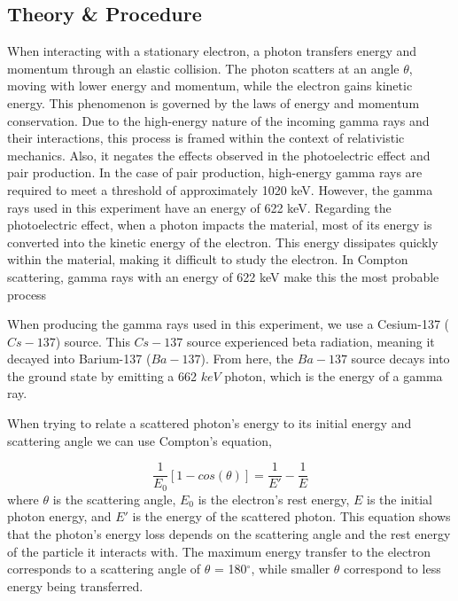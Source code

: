 \documentclass[a4paper,12pt,english]{all-in-one} %
\begin{document}
\begin{multicols}{2}

\section*{Theory \& Procedure}
{
When interacting with a stationary electron, a photon transfers energy and momentum through an elastic collision. The photon scatters at an angle $\theta$, moving with lower energy and momentum, while the electron gains kinetic energy. This phenomenon is governed by the laws of energy and momentum conservation. Due to the high-energy nature of the incoming gamma rays and their interactions, this process is framed within the context of relativistic mechanics. Also, it negates the effects observed in the photoelectric effect and pair production. In the case of pair production, high-energy gamma rays are required to meet a threshold of approximately 1020 keV. However, the gamma rays used in this experiment have an energy of 622 keV. Regarding the photoelectric effect, when a photon impacts the material, most of its energy is converted into the kinetic energy of the electron. This energy dissipates quickly within the material, making it difficult to study the electron. In Compton scattering, gamma rays with an energy of 622 keV make this the most probable process

When producing the gamma rays used in this experiment, we use a Cesium-137 ($Cs-137$) source. This $Cs-137$ source experienced beta radiation, meaning it decayed into Barium-137 ($Ba-137$). From here, the $Ba-137$ source decays into the ground state by emitting a 662 $keV$ photon, which is the energy of a gamma ray.


When trying to relate a scattered photon's energy to its initial energy and scattering angle we can use  Compton's equation,

\begin{equation}
    \frac{1}{E_0}[1-cos(\theta)] = \frac{1}{E'} - \frac{1}{E}
\end{equation}
where $\theta$ is the scattering angle, $E_0$ is the electron's rest energy, $E$ is the initial photon energy, and $E'$ is the energy of the scattered photon. This equation shows that the photon's energy loss depends on the scattering angle and the rest energy of the particle it interacts with. The maximum energy transfer to the electron corresponds to a scattering angle of $\theta$ = 180$^\circ$, while smaller $\theta$ correspond to less energy being transferred.

}
\end{multicols}
\end{document}
